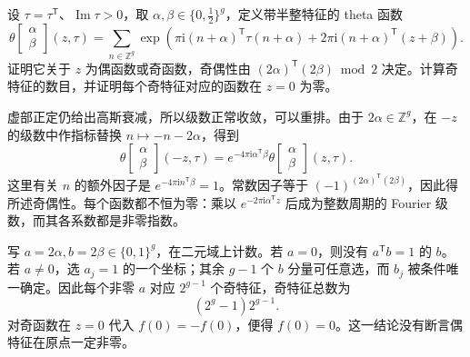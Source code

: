 \begin{exercise}
	\label{g4:ex:0404:theta-characteristics}
	设 \(\tau=\tau^{\mathsf T}\)、\(\operatorname{Im}\tau>0\)，取 \(\alpha,\beta\in\{0,\tfrac12\}^g\)，定义带半整特征的 theta 函数
	\[
		\theta\left[\begin{matrix}\alpha\\ \beta\end{matrix}\right](z,\tau)
		=\sum_{n\in\mathbb Z^g}
		\exp\left(\pi\mathrm{i}(n+\alpha)^{\mathsf T}\tau(n+\alpha)
		+2\pi\mathrm{i}(n+\alpha)^{\mathsf T}(z+\beta)\right).
	\]
	证明它关于 \(z\) 为偶函数或奇函数，奇偶性由 \((2\alpha)^{\mathsf T}(2\beta)\bmod2\) 决定。计算奇特征的数目，并证明每个奇特征对应的函数在 \(z=0\) 为零。
\end{exercise}
\begin{solution}
	虚部正定仍给出高斯衰减，所以级数正常收敛，可以重排。由于 \(2\alpha\in\mathbb Z^g\)，在 \(-z\) 的级数中作指标替换 \(n\mapsto-n-2\alpha\)，得到
	\[
		\theta\left[\begin{matrix}\alpha\\ \beta\end{matrix}\right](-z,\tau)
		=e^{-4\pi\mathrm{i}\alpha^{\mathsf T}\beta}
		\theta\left[\begin{matrix}\alpha\\ \beta\end{matrix}\right](z,\tau).
	\]
	这里有关 \(n\) 的额外因子是 \(e^{-4\pi\mathrm{i}n^{\mathsf T}\beta}=1\)。常数因子等于 \((-1)^{(2\alpha)^{\mathsf T}(2\beta)}\)，因此得所述奇偶性。每个函数都不恒为零：乘以 \(e^{-2\pi\mathrm{i}\alpha^{\mathsf T}z}\) 后成为整数周期的 Fourier 级数，而其各系数都是非零指数。

	写 \(a=2\alpha,b=2\beta\in\{0,1\}^g\)，在二元域上计数。若 \(a=0\)，则没有 \(a^{\mathsf T}b=1\) 的 \(b\)。若 \(a\ne0\)，选 \(a_j=1\) 的一个坐标；其余 \(g-1\) 个 \(b\) 分量可任意选，而 \(b_j\) 被条件唯一确定。因此每个非零 \(a\) 对应 \(2^{g-1}\) 个奇特征，奇特征总数为
	\[
		(2^g-1)2^{g-1}.
	\]
	对奇函数在 \(z=0\) 代入 \(f(0)=-f(0)\)，便得 \(f(0)=0\)。这一结论没有断言偶特征在原点一定非零。
\end{solution}

